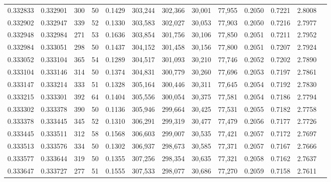 \begin{tabular}{rrrrrrrrrrrrr}
0.332833 & 0.332901 &   300 &  50 &                                     0.1429 & 303,244 & 302,366 &  30,001 &  77,955 & 0.2050 & 0.7221 & 2.8008 \\
0.332902 & 0.332947 &   339 &  52 &                                     0.1330 & 303,583 & 302,027 &  30,053 &  77,903 & 0.2050 & 0.7216 & 2.7977 \\
0.332948 & 0.332984 &   271 &  53 &                                     0.1636 & 303,854 & 301,756 &  30,106 &  77,850 & 0.2051 & 0.7211 & 2.7952 \\
0.332984 & 0.333051 &   298 &  50 &                                     0.1437 & 304,152 & 301,458 &  30,156 &  77,800 & 0.2051 & 0.7207 & 2.7924 \\
0.333052 & 0.333104 &   365 &  54 &                                     0.1289 & 304,517 & 301,093 &  30,210 &  77,746 & 0.2052 & 0.7202 & 2.7890 \\
0.333104 & 0.333146 &   314 &  50 &                                     0.1374 & 304,831 & 300,779 &  30,260 &  77,696 & 0.2053 & 0.7197 & 2.7861 \\
0.333147 & 0.333214 &   333 &  51 &                                     0.1328 & 305,164 & 300,446 &  30,311 &  77,645 & 0.2054 & 0.7192 & 2.7830 \\
0.333215 & 0.333301 &   392 &  64 &                                     0.1404 & 305,556 & 300,054 &  30,375 &  77,581 & 0.2054 & 0.7186 & 2.7794 \\
0.333302 & 0.333378 &   390 &  50 &                                     0.1136 & 305,946 & 299,664 &  30,425 &  77,531 & 0.2055 & 0.7182 & 2.7758 \\
0.333378 & 0.333445 &   345 &  52 &                                     0.1310 & 306,291 & 299,319 &  30,477 &  77,479 & 0.2056 & 0.7177 & 2.7726 \\
0.333445 & 0.333511 &   312 &  58 &                                     0.1568 & 306,603 & 299,007 &  30,535 &  77,421 & 0.2057 & 0.7172 & 2.7697 \\
0.333513 & 0.333576 &   334 &  50 &                                     0.1302 & 306,937 & 298,673 &  30,585 &  77,371 & 0.2057 & 0.7167 & 2.7666 \\
0.333577 & 0.333644 &   319 &  50 &                                     0.1355 & 307,256 & 298,354 &  30,635 &  77,321 & 0.2058 & 0.7162 & 2.7637 \\
0.333647 & 0.333727 &   277 &  51 &                                     0.1555 & 307,533 & 298,077 &  30,686 &  77,270 & 0.2059 & 0.7158 & 2.7611 \\

\end{tabular}
